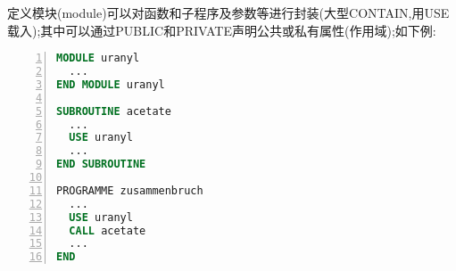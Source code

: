 定义模块(module)可以对函数和子程序及参数等进行封装(大型CONTAIN,用USE载入);其中可以通过PUBLIC和PRIVATE声明公共或私有属性(作用域);如下例:

\begin{lstlisting}[numbers=left,frame=single,language=Fortran]
MODULE uranyl
  ...
END MODULE uranyl

SUBROUTINE acetate
  ...
  USE uranyl
  ...
END SUBROUTINE

PROGRAMME zusammenbruch
  ...
  USE uranyl
  CALL acetate
  ...
END
\end{lstlisting}
\par

















